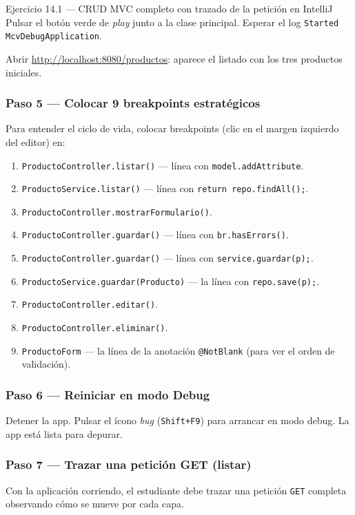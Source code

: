\documentclass[11pt,a4paper,openany]{book}
\begin{document}
\begin{cajaejercicio}{Ejercicio 14.1 --- CRUD MVC completo con trazado de la petición en IntelliJ}
Pulsar el botón verde de \emph{play} junto a la clase principal.
Esperar el log \texttt{Started McvDebugApplication}.

Abrir \url{http://localhost:8080/productos}: aparece el listado con
los tres productos iniciales.

\subsubsection*{Paso 5 --- Colocar 9 breakpoints estratégicos}

Para entender el ciclo de vida, colocar breakpoints (clic en el
margen izquierdo del editor) en:

\begin{enumerate}
\item \texttt{ProductoController.listar()} --- línea con
\texttt{model.addAttribute}.
\item \texttt{ProductoService.listar()} --- línea con
\texttt{return repo.findAll();}.
\item \texttt{ProductoController.mostrarFormulario()}.
\item \texttt{ProductoController.guardar()} --- línea con
\texttt{br.hasErrors()}.
\item \texttt{ProductoController.guardar()} --- línea con
\texttt{service.guardar(p);}.
\item \texttt{ProductoService.guardar(Producto)} --- la línea con
\texttt{repo.save(p);}.
\item \texttt{ProductoController.editar()}.
\item \texttt{ProductoController.eliminar()}.
\item \texttt{ProductoForm} --- la línea de la anotación
\texttt{@NotBlank} (para ver el orden de validación).
\end{enumerate}

\subsubsection*{Paso 6 --- Reiniciar en modo Debug}

Detener la app. Pulsar el ícono \emph{bug} (\texttt{Shift+F9}) para
arrancar en modo debug. La app está lista para depurar.

\subsubsection*{Paso 7 --- Trazar una petición GET (listar)}

Con la aplicación corriendo, el estudiante debe trazar una
petición \texttt{GET} completa observando cómo se mueve por cada
capa.



\end{cajaejercicio}
\end{document}
